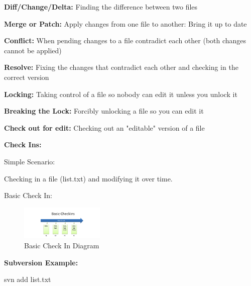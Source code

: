 \documentclass{article}
\begin{document}
\begin{flushleft}
\textbf{Diff/Change/Delta:} Finding the difference between two files \\
\par

\textbf{Merge or Patch:} Apply changes from one file to another: Bring it up to date \\
\par

\textbf{Conflict:} When pending changes to a file contradict each other (both changes cannot be applied) \\
\par

\textbf{Resolve:} Fixing the changes that contradict each other and checking in the correct version \\
\par

\textbf{Locking:} Taking control of a file so nobody can edit it unless you unlock it \\
\par

\textbf{Breaking the Lock:} Forcibly unlocking a file so you can edit it \\
\par

\textbf{Check out for edit:} Checking out an "editable" version of a file \\
\par

\textbf{Check Ins:} \\
\par

Simple Scenario: \\
\par

Checking in a file (list.txt) and modifying it over time.

Basic Check  In:

\begin{figure}[htp]
\centering
\includegraphics[width=4cm]{BasicCheckIn.png}
\caption{Basic Check In Diagram}
\label{fig:BCIDiagram}
\end{figure} 


\textbf{Subversion Example:} \\
\par

svn add list.txt \par


\end{flushleft}
\end{document}
